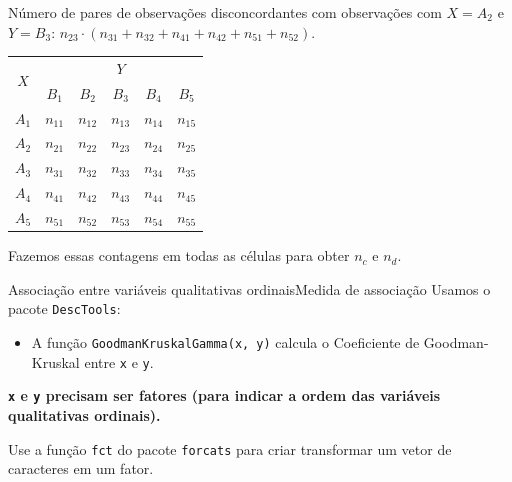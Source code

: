 \documentclass[
  10pt,
  ignorenonframetext,
]{beamer}
\providecommand{\tightlist}{%
  \setlength{\itemsep}{0pt}\setlength{\parskip}{0pt}}\usepackage{longtable,booktabs,array}
\begin{document}
\begin{frame}
Número de pares de observações disconcordantes com observações com
\(X=A_2\) e \(Y=B_3\):
\(n_{23}\cdot (n_{31} + n_{32} + n_{41} + n_{42} + n_{51} + n_{52})\).

\begin{table}
\begin{tabular}{c|ccccc}
\toprule
\multicolumn{1}{c}{\multirow{2}{*}{$X$}} & \multicolumn{5}{c}{$Y$}  \\ \cmidrule{2-6}
\multicolumn{1}{c}{}                   & $B_1$ & $B_2$ & $B_3$ & $B_4$ & $B_5$ \\ \midrule
$A_1$                                     & $n_{11}$   &  $n_{12}$  & $n_{13}$   &  $n_{14}$  & $n_{15}$   \\
$A_2$                                     & $n_{21}$   &  $n_{22}$  & \cellcolor{gray} $n_{23}$   &  $n_{24}$  & $n_{25}$   \\
$A_3$                                     & \cellcolor{WildStrawberry} $n_{31}$   & \cellcolor{WildStrawberry}  $n_{32}$  & $n_{33}$   &  $n_{34}$  & $n_{35}$   \\
$A_4$                                     & \cellcolor{WildStrawberry} $n_{41}$   &  \cellcolor{WildStrawberry} $n_{42}$  & $n_{43}$   &  $n_{44}$  & $n_{45}$   \\
$A_5$                                     & \cellcolor{WildStrawberry} $n_{51}$   & \cellcolor{WildStrawberry}  $n_{52}$  & $n_{53}$   &  $n_{54}$  & $n_{55}$   \\
\bottomrule
\end{tabular}
\end{table}

Fazemos essas contagens em todas as células para obter \(n_c\) e
\(n_d\).
\end{frame}

\begin{frame}[fragile]{Associação entre variáveis qualitativas
ordinais\newline Medida de associação}
\protect\hypertarget{associauxe7uxe3o-entre-variuxe1veis-qualitativas-ordinaismedida-de-associauxe7uxe3o-4}{}
Usamos o pacote \texttt{DescTools}:

\begin{itemize}
\tightlist
\item
  A função \texttt{GoodmanKruskalGamma(x,\ y)} calcula o Coeficiente de
  Goodman-Kruskal entre \texttt{x} e \texttt{y}.
\end{itemize}

\textbf{\texttt{x} e \texttt{y} precisam ser fatores (para indicar a
ordem das variáveis qualitativas ordinais).}

Use a função \texttt{fct} do pacote \texttt{forcats} para criar
transformar um vetor de caracteres em um fator.
\end{frame}
\end{document}
